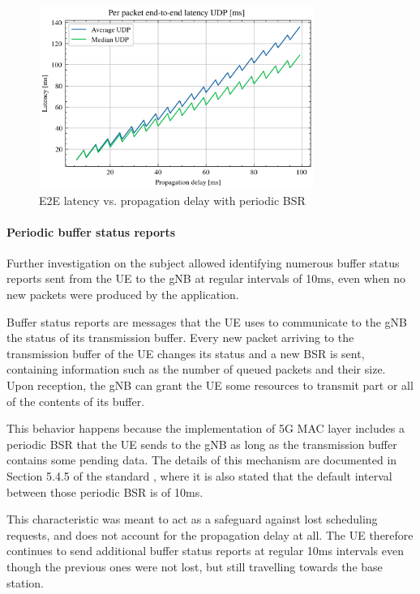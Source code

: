 \begin{figure}[ht]
    \centering
    \includegraphics[width=0.8\textwidth]{res/lat-udp-saw.png}
    \caption{E2E latency vs. propagation delay with periodic \ac{BSR}}
    \label{fig:lat-saw}
\end{figure}

\paragraph{Periodic buffer status reports} Further investigation on the subject allowed identifying numerous buffer status reports sent from the \ac{UE} to the \ac{gNB} at regular intervals of 10ms, even when no new packets were produced by the application.

Buffer status reports are messages that the \ac{UE} uses to communicate to the \ac{gNB} the status of its transmission buffer. Every new packet arriving to the transmission buffer of the \ac{UE} changes its status and a new \ac{BSR} is sent, containing information such as the number of queued packets and their size. Upon reception, the \ac{gNB} can grant the \ac{UE} some resources to transmit part or all of the contents of its buffer.

This behavior happens because the implementation of 5G \ac{MAC} layer includes a periodic \ac{BSR} that the \ac{UE} sends to the \ac{gNB} as long as the transmission buffer contains some pending data.
The details of this mechanism are documented in Section 5.4.5 of the standard \cite{etsi-mac-specification}, where it is also stated that the default interval between those periodic \ac{BSR} is of 10ms.

This characteristic was meant to act as a safeguard against lost scheduling requests, and does not account for the propagation delay at all. The \ac{UE} therefore continues to send additional buffer status reports at regular 10ms intervals even though the previous ones were not lost, but still travelling towards the base station.

